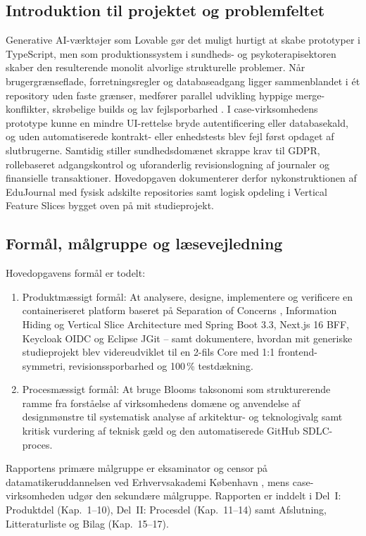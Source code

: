 \documentclass[11pt,a4paper]{article}
\begin{document}
\begin{table}[htbp]
\subsection{Introduktion til projektet og problemfeltet}
Generative AI-værktøjer som Lovable gør det muligt hurtigt at skabe prototyper i TypeScript, men som produktionssystem i sundheds- og psykoterapisektoren skaber den resulterende monolit alvorlige strukturelle problemer. Når brugergrænseflade, forretningsregler og databaseadgang ligger sammenblandet i ét repository uden faste grænser, medfører parallel udvikling hyppige merge-konflikter, skrøbelige builds og lav fejlsporbarhed \cite{fowler2002, newman2021}. I case-virksomhedens prototype kunne en mindre UI-rettelse bryde autentificering eller databasekald, og uden automatiserede kontrakt- eller enhedstests blev fejl først opdaget af slutbrugerne. Samtidig stiller sundhedsdomænet skrappe krav til GDPR, rollebaseret adgangskontrol og uforanderlig revisionslogning af journaler og finansielle transaktioner. Hovedopgaven dokumenterer derfor nykonstruktionen af EduJournal med fysisk adskilte repositories samt logisk opdeling i Vertical Feature Slices bygget oven på mit studieprojekt.

\subsection{Formål, målgruppe og læsevejledning}
Hovedopgavens formål er todelt:
\begin{enumerate}[noitemsep]
    \item Produktmæssigt formål: At analysere, designe, implementere og verificere en containeriseret platform baseret på Separation of Concerns \cite{fowler2002}, Information Hiding \cite{parnas1972} og Vertical Slice Architecture \cite{bogard2018} med Spring Boot 3.3, Next.js 16 BFF, Keycloak OIDC og Eclipse JGit -- samt dokumentere, hvordan mit generiske studieprojekt blev videreudviklet til en 2-fils Core med 1:1 frontend-symmetri, revisionssporbarhed og 100\,\% testdækning.
    \item Procesmæssigt formål: At bruge Blooms taksonomi \cite{bloom1956} som strukturerende ramme fra forståelse af virksomhedens domæne og anvendelse af designmønstre til systematisk analyse af arkitektur- og teknologivalg samt kritisk vurdering af teknisk gæld og den automatiserede GitHub SDLC-proces.
\end{enumerate}
Rapportens primære målgruppe er eksaminator og censor på datamatikeruddannelsen ved Erhvervsakademi København \cite{ek_studieordning2024}, mens case-virksomheden udgør den sekundære målgruppe. Rapporten er inddelt i Del~I: Produktdel (Kap.~1--10), Del~II: Procesdel (Kap.~11--14) samt Afslutning, Litteraturliste og Bilag (Kap.~15--17).


\end{table}
\end{document}
